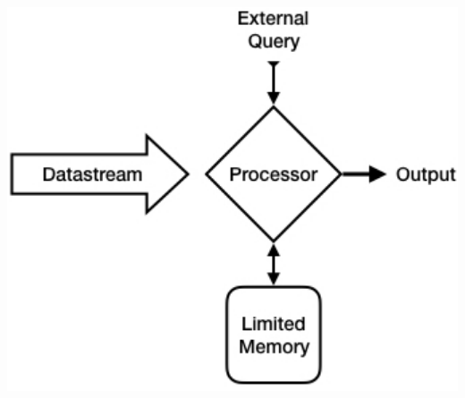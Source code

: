 \documentclass{beamer}
\begin{document}
\begin{frame}
\begin{columns}
\begin{column}{0.45\textwidth}
\begin{center}
	\includegraphics[width=1.0\textwidth]{stream_model}
\end{center}
\end{column}

\end{columns}
\end{frame}

\end{document}

